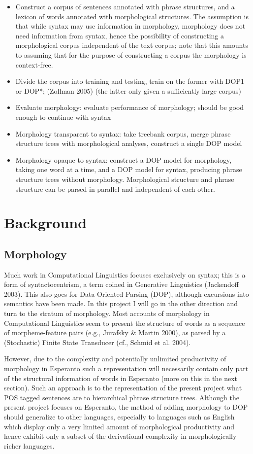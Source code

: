\documentclass[10pt,a4paper]{article}
\begin{document}
\begin{itemize}
\item Construct a corpus of sentences annotated with phrase structures, and a 
lexicon of words annotated with morphological structures. The assumption is
that while syntax may use information in morphology, morphology does not need
information from syntax, hence the possibility of constructing a morphological
corpus independent of the text corpus; note that this amounts to assuming that
for the purpose of constructing a corpus the morphology is context-free.
\item Divide the corpus into training and testing, train on the former with DOP1 or 
DOP*; (Zollman 2005) (the latter only given a sufficiently large corpus)
\item Evaluate morphology: evaluate performance of morphology; should be good 
enough to continue with syntax
\item Morphology transparent to syntax: take treebank corpus, merge phrase 
structure trees with morphological analyses, construct a single DOP model
\item Morphology opaque to syntax: construct a DOP model for morphology, taking one 
word at a time, and a DOP model for syntax, producing phrase structure trees
without morphology.  Morphological structure and phrase structure can be parsed
in parallel and independent of each other.
\end{itemize}

\section{Background}
\subsection{Morphology}

Much work in Computational Linguistics focuses exclusively on syntax; this is
a form of syntactocentrism, a term coined in Generative Linguistics 
(Jackendoff 2003). This also goes for Data-Oriented Parsing (DOP), although
excursions into semantics have been made. In this project I will go in the
other direction and turn to the stratum of morphology. Most accounts of
morphology in Computational Linguistics seem to present the structure of words
as a sequence of morpheme-feature pairs (e.g., Jurafsky \& Martin 2000),
as parsed by a (Stochastic) Finite State Transducer (cf., Schmid et al. 2004).

However, due to the complexity and potentially unlimited productivity of
morphology in Esperanto such a representation will necessarily contain only
part of the structural information of words in Esperanto (more on this in the
next section). Such an approach is to the representation of the present project
what POS tagged sentences are to hierarchical phrase structure trees. Although
the present project focuses on Esperanto, the method of adding morphology to
DOP should generalize to other languages, especially to languages such as
English which display only a very limited amount of morphological productivity
and hence exhibit only a subset of the derivational complexity in
morphologically richer languages.
\end{document}
